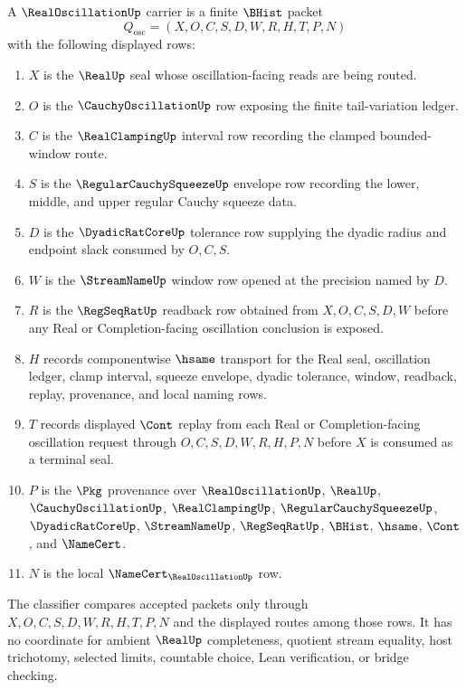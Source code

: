 \begin{definition}
\label{def:real-oscillation-carrier}
A $\RealOscillationUp$ carrier is a finite $\BHist$ packet
$$
Q_{\mathrm{osc}}=(X,O,C,S,D,W,R,H,T,P,N)
$$
with the following displayed rows:
\begin{enumerate}
\item $X$ is the $\RealUp$ seal whose oscillation-facing reads are being routed.
\item $O$ is the $\CauchyOscillationUp$ row exposing the finite tail-variation ledger.
\item $C$ is the $\RealClampingUp$ interval row recording the clamped bounded-window route.
\item $S$ is the $\RegularCauchySqueezeUp$ envelope row recording the lower, middle, and upper regular Cauchy squeeze data.
\item $D$ is the $\DyadicRatCoreUp$ tolerance row supplying the dyadic radius and endpoint slack consumed by $O,C,S$.
\item $W$ is the $\StreamNameUp$ window row opened at the precision named by $D$.
\item $R$ is the $\RegSeqRatUp$ readback row obtained from $X,O,C,S,D,W$ before any Real or Completion-facing oscillation conclusion is exposed.
\item $H$ records componentwise $\hsame$ transport for the Real seal, oscillation ledger, clamp interval, squeeze envelope, dyadic tolerance, window, readback, replay, provenance, and local naming rows.
\item $T$ records displayed $\Cont$ replay from each Real or Completion-facing oscillation request through $O,C,S,D,W,R,H,P,N$ before $X$ is consumed as a terminal seal.
\item $P$ is the $\Pkg$ provenance over $\RealOscillationUp$, $\RealUp$, $\CauchyOscillationUp$, $\RealClampingUp$, $\RegularCauchySqueezeUp$, $\DyadicRatCoreUp$, $\StreamNameUp$, $\RegSeqRatUp$, $\BHist$, $\hsame$, $\Cont$, and $\NameCert$.
\item $N$ is the local $\NameCert_{\RealOscillationUp}$ row.
\end{enumerate}
The classifier compares accepted packets only through $X,O,C,S,D,W,R,H,T,P,N$ and the displayed routes among those rows. It has no coordinate for ambient $\RealUp$ completeness, quotient stream equality, host trichotomy, selected limits, countable choice, Lean verification, or bridge checking.
\end{definition}

